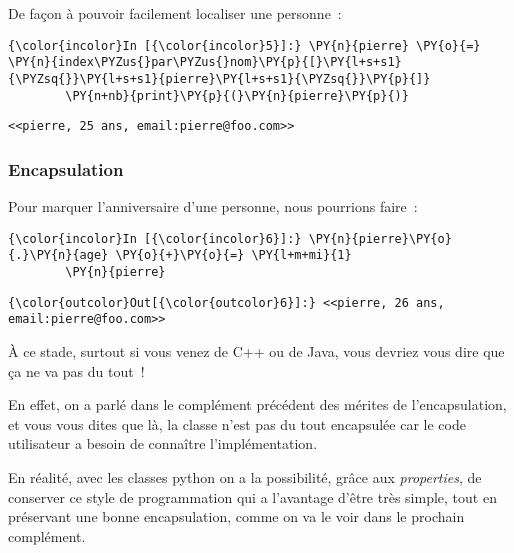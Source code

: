     De façon à pouvoir facilement localiser une personne~:

    \begin{Verbatim}[commandchars=\\\{\},frame=single,framerule=0.3mm,rulecolor=\color{cellframecolor}]
{\color{incolor}In [{\color{incolor}5}]:} \PY{n}{pierre} \PY{o}{=} \PY{n}{index\PYZus{}par\PYZus{}nom}\PY{p}{[}\PY{l+s+s1}{\PYZsq{}}\PY{l+s+s1}{pierre}\PY{l+s+s1}{\PYZsq{}}\PY{p}{]}
        \PY{n+nb}{print}\PY{p}{(}\PY{n}{pierre}\PY{p}{)}
\end{Verbatim}


    \begin{Verbatim}[commandchars=\\\{\},frame=single,framerule=0.3mm,rulecolor=\color{cellframecolor}]
<<pierre, 25 ans, email:pierre@foo.com>>
\end{Verbatim}

    \hypertarget{encapsulation}{%
\subsubsection{Encapsulation}\label{encapsulation}}

    Pour marquer l'anniversaire d'une personne, nous pourrions faire~:

    \begin{Verbatim}[commandchars=\\\{\},frame=single,framerule=0.3mm,rulecolor=\color{cellframecolor}]
{\color{incolor}In [{\color{incolor}6}]:} \PY{n}{pierre}\PY{o}{.}\PY{n}{age} \PY{o}{+}\PY{o}{=} \PY{l+m+mi}{1}
        \PY{n}{pierre}
\end{Verbatim}


\begin{Verbatim}[commandchars=\\\{\},frame=single,framerule=0.3mm,rulecolor=\color{cellframecolor}]
{\color{outcolor}Out[{\color{outcolor}6}]:} <<pierre, 26 ans, email:pierre@foo.com>>
\end{Verbatim}
            
    À ce stade, surtout si vous venez de C++ ou de Java, vous devriez vous
dire que ça ne va pas du tout~!

En effet, on a parlé dans le complément précédent des mérites de
l'encapsulation, et vous vous dites que là, la classe n'est pas du tout
encapsulée car le code utilisateur a besoin de connaître
l'implémentation.

    En réalité, avec les classes python on a la possibilité, grâce aux
\emph{properties}, de conserver ce style de programmation qui a
l'avantage d'être très simple, tout en préservant une bonne
encapsulation, comme on va le voir dans le prochain complément.

